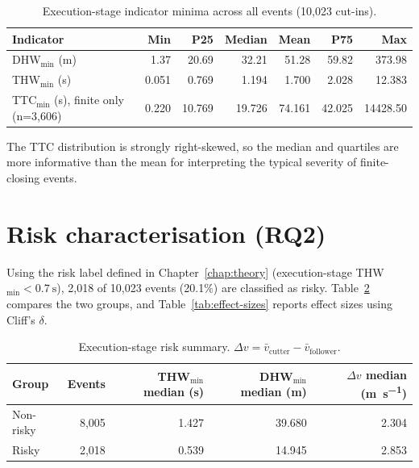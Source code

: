 \documentclass[12pt,a4paper,twoside,openright]{report}
\begin{document}
    \begin{table}[H]
        \centering
        \caption{Execution-stage indicator minima across all events (10,023 cut-ins).}
        \label{tab:exec-dist}
        {\small
        \setlength{\tabcolsep}{4pt}
            \begin{tabular}{@{}lrrrrrr@{}}
                \toprule
                Indicator & Min & P25 & Median & Mean & P75 & Max \\
                \midrule
                DHW$_{\min}$ (m) & 1.37 & 20.69 & 32.21 & 51.28 & 59.82 & 373.98 \\
                THW$_{\min}$ (s) & 0.051 & 0.769 & 1.194 & 1.700 & 2.028 & 12.383 \\
                TTC$_{\min}$ (s), finite only (n=3,606) & 0.220 & 10.769 & 19.726 & 74.161 & 42.025 & 14428.50 \\
                \bottomrule
            \end{tabular}}
    \end{table}

    The TTC distribution is strongly right-skewed, so the median and quartiles are more informative than the mean for interpreting the typical severity of finite-closing events.

    \section{Risk characterisation (RQ2)}
    Using the risk label defined in Chapter~\ref{chap:theory} (execution-stage THW$_{\min} < \SI{0.7}{\second}$), 2,018 of 10,023 events (20.1\%) are classified as risky. Table~\ref{tab:risk-summary} compares the two groups, and Table~\ref{tab:effect-sizes} reports effect sizes using Cliff's $\delta$.

    \begin{table}[H]
        \centering
        \caption{Execution-stage risk summary. $\Delta v = \bar v_{\text{cutter}}-\bar v_{\text{follower}}$.}
        \label{tab:risk-summary}
        {\small
        \setlength{\tabcolsep}{4pt}
            \begin{tabular}{@{}lrrrr@{}}
                \toprule
                Group & Events & THW$_{\min}$ median (s) & DHW$_{\min}$ median (m) & $\Delta v$ median (\si{\meter\per\second}) \\
                \midrule
                Non-risky & 8,005 & 1.427 & 39.680 & 2.304 \\
                Risky & 2,018 & 0.539 & 14.945 & 2.853 \\
                \bottomrule
            \end{tabular}}
    \end{table}
\end{document}
